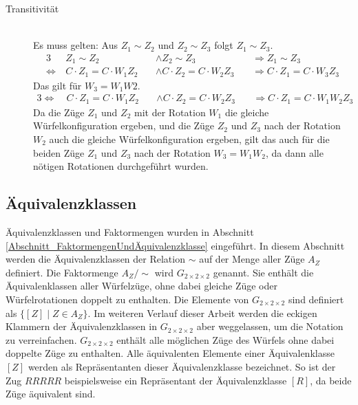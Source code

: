 \documentclass[12pt,a4paper, usenames, dvipsnames]{article}
\theoremstyle{mystyle}
\theoremstyle{definition}
\newcommand{\Gtwo}{\ensuremath{G_{2\times 2\times 2}}}
\begin{document}
\begin{description}
\item [Transitivität] \ \\
Es muss gelten: Aus $Z_1 \sim Z_2$ und $Z_2 \sim Z_3$ folgt $Z_1 \sim Z_3$.
\begin{alignat*}{3}
& Z_1 \sim Z_2 && \wedge Z_2 \sim Z_3 && \Rightarrow Z_1 \sim Z_3 \\
\Leftrightarrow \ & C \cdot  Z_1 = C \cdot  W_1Z_2 \ && \wedge C \cdot  Z_2 = C \cdot  W_2Z_3 \ && \Rightarrow C \cdot  Z_1 = C \cdot  W_3Z_3
\end{alignat*}
Das gilt für $W_3=W_1W2$.
\begin{alignat*}{3}
\Leftrightarrow \ & C \cdot  Z_1 = C \cdot  W_1Z_2 \ && \wedge C \cdot  Z_2 = C \cdot W_2Z_3 \ && \Rightarrow C \cdot  Z_1 = C \cdot W_1W_2Z_3 
\end{alignat*}
Da die Züge $Z_1$ und $Z_2$ mit der Rotation $W_1$ die gleiche Würfelkonfiguration ergeben, und die Züge $Z_2$ und $Z_3$ nach der Rotation $W_2$ auch die gleiche Würfelkonfiguration ergeben, gilt das auch für die beiden Züge $Z_1$ und $Z_3$ nach der Rotation $W_3=W_1W_2$, da dann alle nötigen Rotationen durchgeführt wurden.

\end{description}




%
%
%
%
%
%
%
%
%
%
%
%
%
%
%
%
%
%
%
%


\subsection{Äquivalenzklassen} 

Äquivalenzklassen und Faktormengen wurden in Abschnitt \ref{Abschnitt_FaktormengenUndÄquivalenzklasse} eingeführt. In diesem Abschnitt werden die Äquivalenzklassen der Relation $\sim$ auf der Menge aller Züge $A_Z$ definiert. Die Faktormenge $A_Z / \sim$ wird $\Gtwo$ genannt. Sie enthält die Äquivalenklassen aller Würfelzüge, ohne dabei gleiche Züge oder Würfelrotationen doppelt zu enthalten. Die Elemente von $\Gtwo$ sind definiert als $\{[Z] \mid Z \in A_Z \}$. Im weiteren Verlauf dieser Arbeit werden die eckigen Klammern der Äquivalenzklassen in $\Gtwo$ aber weggelassen, um die Notation zu verreinfachen. $\Gtwo$ enthält alle möglichen Züge des Würfels ohne dabei doppelte Züge zu enthalten. Alle äquivalenten Elemente einer Äquivalenklasse $[Z]$ werden als Repräsentanten dieser Äquivalenzklasse bezeichnet. So ist der Zug $RRRRR$ beispielsweise ein Repräsentant der Äquivalenzklasse $[R]$, da beide Züge äquivalent sind.
\end{document}
